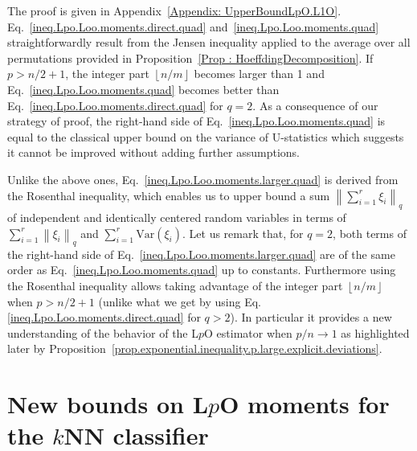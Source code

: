 \documentclass[twoside,11pt]{article}
\numberwithin{equation}{section}
\newcommand{\floor}[1]{\left\lfloor #1 \right\rfloor}
\newcommand{\1}{\mathds{1}}%
\newcommand{\norm}[1]{\left\| #1 \right\|}
\newcommand{\Var}{\mathrm{Var}}
\numberwithin{equation}{section}
\theoremstyle{plain}
\begin{document}
%
The proof is given in Appendix~\ref{Appendix: UpperBoundLpO.L1O}.
%
Eq.~\eqref{ineq.Lpo.Loo.moments.direct.quad} and~\eqref{ineq.Lpo.Loo.moments.quad} straightforwardly result from the Jensen inequality applied to the average over all permutations provided in Proposition~\ref{Prop : HoeffdingDecomposition}.
%
If $p>n/2+1$, the integer part $\floor{n/m}$ becomes larger than 1 and Eq.~\eqref{ineq.Lpo.Loo.moments.quad} becomes better than Eq.~\eqref{ineq.Lpo.Loo.moments.direct.quad} for $q=2$.
%
As a consequence of our strategy of proof, the right-hand side of Eq.~\eqref{ineq.Lpo.Loo.moments.quad} is equal to the classical upper bound on the variance of U-statistics which suggests it cannot be improved without adding further assumptions.


Unlike the above ones, Eq.~\eqref{ineq.Lpo.Loo.moments.larger.quad} is derived from the Rosenthal inequality, which enables us to upper bound a sum $\norm{\sum_{i=1}^r \xi_i }_q$ of independent and identically centered random variables in terms of $\sum_{i=1}^r \norm{\xi_i }_q$ and $\sum_{i=1}^r\Var(\xi_i)$.
%
Let us remark that, for $q=2$, both terms of the right-hand side of Eq.~\eqref{ineq.Lpo.Loo.moments.larger.quad} are of the same order as Eq.~\eqref{ineq.Lpo.Loo.moments.quad} up to constants.
%
Furthermore using the Rosenthal inequality allows taking advantage of the integer part $\floor{n/m}$ when $p>n/2+1$ (unlike what we get by using Eq.\eqref{ineq.Lpo.Loo.moments.direct.quad} for $q>2$).
%
In particular it provides a new understanding of the behavior of the L$p$O estimator when $p/n \to 1$ as highlighted later by Proposition~\ref{prop.exponential.inequality.p.large.explicit.deviations}.
%












\section{New bounds on L$p$O moments for the $k$NN classifier} \label{Section: Polynomial}
\end{document}
